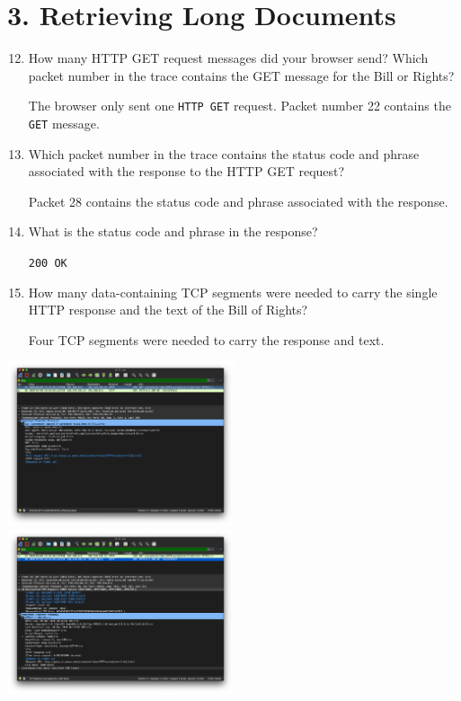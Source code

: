 \documentclass{article}
\begin{document}
\section*{3. Retrieving Long Documents}
\begin{enumerate}
\setcounter{enumi}{11}
\item How many HTTP GET request messages did your browser send? Which packet number in the trace contains the GET message for the Bill or Rights?

\textsf{The browser only sent one \texttt{HTTP GET} request. Packet number 22 contains the \texttt{GET} message.}

\item Which packet number in the trace contains the status code and phrase associated with the response to the HTTP GET request?

\textsf{Packet 28 contains the status code and phrase associated with the response.}

\item What is the status code and phrase in the response?

\texttt{200 OK}

\item How many data-containing TCP segments were needed to carry the single HTTP response and the text of the Bill of Rights?

\textsf{Four TCP segments were needed to carry the response and text.}
\end{enumerate}
\includegraphics[width=0.5\textwidth]{lab2_part3_get}
\includegraphics[width=0.5\textwidth]{lab2_part3_response}
\end{document}
